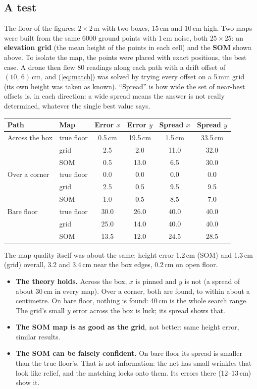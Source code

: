 \documentclass[11pt,a4paper]{article}
\begin{document}
\subsection{A test}
The floor of the figures: $2\times2$\,m with two boxes, 15\,cm and 10\,cm high. Two maps were built from the same
6000 ground points with 1\,cm noise, both $25\times25$: an \textbf{elevation grid} (the mean height of the points in
each cell) and the \textbf{SOM} shown above. To isolate the map, the points were placed with exact positions, the
best case. A drone then flew 80 readings along each path with a drift offset of $(10,\,6)$\,cm, and
(\ref{eq:match}) was solved by trying every offset on a 5\,mm grid (its own height was taken as known).
``Spread'' is how wide the set of near-best offsets is, in each direction: a wide spread means the answer is not
really determined, whatever the single best value says.

\begin{center}\small
\begin{tabular}{@{}llcccc@{}}
\toprule
Path & Map & Error $x$ & Error $y$ & Spread $x$ & Spread $y$\\
\midrule
Across the box & true floor & 0.5\,cm & 19.5\,cm & 1.5\,cm & 33.5\,cm\\
& grid & 2.5 & 2.0 & 11.0 & 32.0\\
& SOM & 0.5 & 13.0 & 6.5 & 30.0\\
\midrule
Over a corner & true floor & 0.0 & 0.0 & 0.0 & 0.0\\
& grid & 2.5 & 0.5 & 9.5 & 9.5\\
& SOM & 1.0 & 0.5 & 8.5 & 7.0\\
\midrule
Bare floor & true floor & 30.0 & 26.0 & 40.0 & 40.0\\
& grid & 25.0 & 14.0 & 40.0 & 40.0\\
& SOM & 13.5 & 12.0 & 24.5 & 28.5\\
\bottomrule
\end{tabular}
\end{center}
The map quality itself was about the same: height error 1.2\,cm (SOM) and 1.3\,cm (grid) overall, 3.2 and
3.4\,cm near the box edges, 0.2\,cm on open floor.

\begin{itemize}[leftmargin=*]
\item \textbf{The theory holds.} Across the box, $x$ is pinned and $y$ is not (a spread of about 30\,cm in every
map). Over a corner, both are found, to within about a centimetre. On bare floor, nothing is found: 40\,cm is the
whole search range. The grid's small $y$ error across the box is luck; its spread shows that.
\item \textbf{The SOM map is as good as the grid}, not better: same height error, similar results.
\item \textbf{The SOM can be falsely confident.} On bare floor its spread is smaller than the true floor's. That is
not information: the net has small wrinkles that look like relief, and the matching locks onto them. Its errors there
(12--13\,cm) show it.
\end{itemize}
\end{document}
